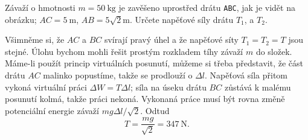 \begin{mdframed}[style=mdexam]
\begin{example}\label{fyz:fey_exam010}
  Závaží o hmotnosti \(m = \SI{50}{\kg}\) je zavěšeno uprostřed drátu \texttt{ABC}, jak je 
  vidět na obrázku; \(AC = \SI{5}{\m}\), \(AB = 5\sqrt{2}\si{\m}\). Určete napěťové síly drátu 
  \(T_1\), a \(T_2\).
      
  {\centering
   \captionsetup{type=figure}
  \par}
  
  Všimněme si, že \(AC\) a \(BC\) svírají pravý úhel a že napěťové síty \(T_1 = T_2 = T\) jsou 
  stejné. Úlohu bychom mohli řešit prostým rozkladem tíhy závaží \(m\) do složek. Máme-li 
  použít princip virtuálních posunutí, můžeme si třeba představit, že část drátu \(AC\) malinko 
  popustíme, takže se prodlouží o \(\Delta l\). Napěťová síla přitom vykoná virtuální práci 
  \(\Delta W = T\Delta l\); síla na úseku drátu \(BC\) zůstává k malému posunutí kolmá, takže 
  práci nekoná. Vykonaná práce musí být rovna změně potenciální energie závaží \(mg\Delta 
  l/\sqrt{2}\). Odtud 
  \begin{equation*}
     T = \frac{mg}{\sqrt{2}}=\SI{347}{\newton}.
  \end{equation*}
\end{example}
\end{mdframed}